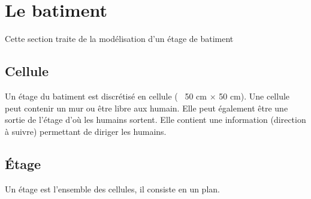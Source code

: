 %
\section{Le batiment}
%
Cette section traite de la modélisation d'un étage de batiment
\subsection{Cellule}
Un étage du batiment est discrétisé en cellule (~ 50 cm $\times$ 50 cm). Une cellule peut contenir un mur ou être libre aux humain. Elle peut également être une sortie de l'étage d'où les humains sortent. Elle contient une information (direction à suivre) permettant de diriger les humains.
%
%
\subsection{Étage}
Un étage est l'ensemble des cellules, il consiste en un plan.
